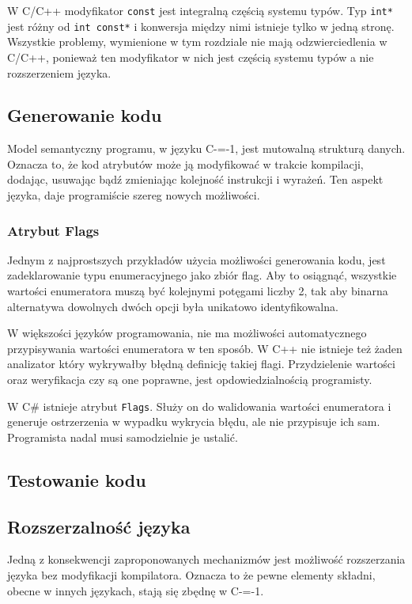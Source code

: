 W C/C++ modyfikator \lstinline{const} jest integralną częścią systemu typów.
Typ \lstinline{int*} jest różny od \lstinline{int const*} i konwersja między nimi istnieje tylko w jedną stronę.
Wszystkie problemy, wymienione w tym rozdziale nie mają odzwierciedlenia w C/C++, ponieważ ten modyfikator w nich jest częścią systemu typów a nie rozszerzeniem języka.

\subsection{Generowanie kodu}

Model semantyczny programu, w języku C-=-1, jest mutowalną strukturą danych.
Oznacza to, że kod atrybutów może ją modyfikować w trakcie kompilacji, dodając, usuwając bądź zmieniając kolejność instrukcji i wyrażeń.
Ten aspekt języka, daje programiście szereg nowych możliwości.

\subsubsection{Atrybut Flags}

Jednym z najprostszych przykładów użycia możliwości generowania kodu, jest zadeklarowanie typu enumeracyjnego jako zbiór flag.
Aby to osiągnąć, wszystkie wartości enumeratora muszą być kolejnymi potęgami liczby 2, tak aby binarna alternatywa dowolnych dwóch opcji była unikatowo identyfikowalna.%

W większości języków programowania, nie ma możliwości automatycznego przypisywania wartości enumeratora w ten sposób.
W C++ nie istnieje też żaden analizator który wykrywałby błędną definicję takiej flagi.
Przydzielenie wartości oraz weryfikacja czy są one poprawne, jest opdowiedzialnością programisty.

W C\# istnieje atrybut \lstinline{Flags}.
Służy on do walidowania wartości enumeratora i generuje ostrzerzenia w wypadku wykrycia błędu, ale nie przypisuje ich sam.
Programista nadal musi samodzielnie je ustalić.


\subsection{Testowanie kodu}

\subsection{Rozszerzalność języka}
\label{Language_extensibility}
Jedną z konsekwencji zaproponowanych mechanizmów jest możliwość rozszerzania języka bez modyfikacji kompilatora.
Oznacza to że pewne elementy składni, obecne w innych językach, stają się zbędnę w C-=-1.
